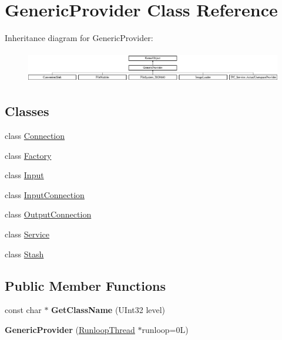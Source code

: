 \hypertarget{class_generic_provider}{}\section{Generic\+Provider Class Reference}
\label{class_generic_provider}
Inheritance diagram for Generic\+Provider\+:\begin{figure}[H]
\begin{center}
\leavevmode
\includegraphics[height=1.388430cm]{class_generic_provider}
\end{center}
\end{figure}
\subsection*{Classes}
\begin{DoxyCompactItemize}
\item 
class \hyperlink{class_generic_provider_1_1_connection}{Connection}
\item 
class \hyperlink{class_generic_provider_1_1_factory}{Factory}
\item 
class \hyperlink{class_generic_provider_1_1_input}{Input}
\item 
class \hyperlink{class_generic_provider_1_1_input_connection}{Input\+Connection}
\item 
class \hyperlink{class_generic_provider_1_1_output_connection}{Output\+Connection}
\item 
class \hyperlink{class_generic_provider_1_1_service}{Service}
\item 
class \hyperlink{class_generic_provider_1_1_stash}{Stash}
\end{DoxyCompactItemize}
\subsection*{Public Member Functions}
\begin{DoxyCompactItemize}
\item 
\mbox{\label{class_generic_provider_af3f64b26dedc39569ba00220d7e02f15}} 
const char $\ast$ {\bfseries Get\+Class\+Name} (U\+Int32 level)
\item 
\mbox{\label{class_generic_provider_a055659c50d30df73d358c9d89a58438d}} 
{\bfseries Generic\+Provider} (\hyperlink{class_runloop_thread}{Runloop\+Thread} $\ast$runloop=0\+L)
\end{DoxyCompactItemize}
